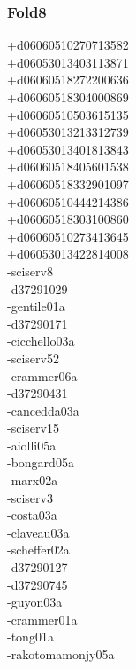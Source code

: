 \begin{multicols}{4}
\subsubsection*{Fold8}
+d06060510270713582\\
+d06053013403113871\\
+d06060518272200636\\
+d06060518304000869\\
+d06060510503615135\\
+d06053013213312739\\
+d06053013401813843\\
+d06060518405601538\\
+d06060518332901097\\
+d06060510444214386\\
+d06060518303100860\\
+d06060510273413645\\
+d06053013422814008\\
-sciserv8\\
-d37291029\\
-gentile01a\\
-d37290171\\
-cicchello03a\\
-sciserv52\\
-crammer06a\\
-d37290431\\
-cancedda03a\\
-sciserv15\\
-aiolli05a\\
-bongard05a\\
-marx02a\\
-sciserv3\\
-costa03a\\
-claveau03a\\
-scheffer02a\\
-d37290127\\
-d37290745\\
-guyon03a\\
-crammer01a\\
-tong01a\\
-rakotomamonjy05a\\

\end{multicols}
